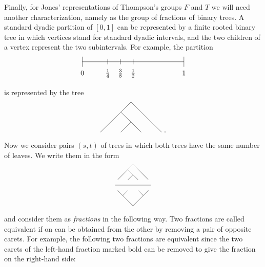 \documentclass[11pt,oneside]{amsart}
\theoremstyle{plain}%
\theoremstyle{definition}
\theoremstyle{remark}
\begin{document}
Finally, for Jones' representations of Thompson's groups $F$ and $T$ we will need another characterization, namely as the group of fractions of binary trees. A standard dyadic partition of $[0, 1]$ can be represented by a finite rooted binary tree in which vertices stand for standard dyadic intervals, and the two children of a vertex represent the two subintervals. For example, the partition
\begin{equation}
	\begin{tikzpicture}[scale=5]
		\def\h{0.025}
		\draw (0, 0) -- (1, 0);
		\draw (0, -2*\h) -- ++(0, 4*\h)  node[at start,below=2pt] {$0$};
		\draw (0.25, -\h) -- ++(0, 2*\h) node[at start,below=3pt] {$\frac{1}{4}$};
		\draw (0.375, -\h) -- ++(0, 2*\h) node[at start,below=3pt] {$\frac{3}{8}$};
		\draw (0.5, -\h) -- ++(0, 2*\h) node[at start,below=3pt] {$\frac{1}{2}$};
		\draw (1, -2*\h) -- ++(0, 4*\h) node[at start,below=2pt] {$1$};
	\end{tikzpicture}
\end{equation}
is represented by the tree
\begin{equation}
	\begin{tikzpicture}[scale=0.5]
		\draw (2.0, 0.0) -- (3.0, 1.0) -- (4.0, 0.0);
		\draw (0.0, 0.0) -- (2.0, 2.0) -- (3.0, 1.0);
		\draw (2.0, 2.0) -- (3.0, 3.0) -- (6.0, 0.0);
	\end{tikzpicture}\ .
\end{equation}
Now we consider pairs $(s, t)$ of trees in which both trees have the same number of leaves. We write them in the form
\begin{equation}
	\begin{tikzpicture}[scale=0.25]
		\draw (2.0, 0.0) -- (3.0, 1.0) -- (4.0, 0.0);
		\draw (0.0, 0.0) -- (2.0, 2.0) -- (3.0, 1.0);
		\draw (2.0, 2.0) -- (3.0, 3.0) -- (6.0, 0.0);

		\draw[yshift=-30pt] (-0.5, 0) -- (6.5, 0);

		\begin{scope}[yscale=-1, yshift=60pt]
			\draw (0.0, 0.0) -- (1.0, 1.0) -- (2.0, 0.0);
			\draw (4.0, 0.0) -- (5.0, 1.0) -- (6.0, 0.0);
			\draw (1.0, 1.0) -- (3.0, 3.0) -- (5.0, 1.0);
		\end{scope}
	\end{tikzpicture}
\end{equation}
and consider them as \emph{fractions} in the following way. Two fractions are called equivalent if on can be obtained from the other by removing a pair of opposite  carets. For example, the following two fractions are equivalent since the two carets of the left-hand fraction marked bold can be removed to give the fraction on the right-hand side:
\end{document}
